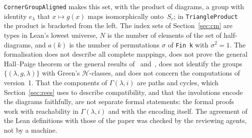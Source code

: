 \documentclass[11pt]{article}
\theoremstyle{remark}
\begin{document}
\texttt{CornerGroupAligned} makes this set, with the product of diagrams, a
group with identity $e_\lambda$ that $x\mapsto g(x)$ maps isomorphically
onto~$S_r$; in
\texttt{TriangleProduct} the product is bracketed from the left. The index sets
of Section~\ref{sec:cm} are types in Lean's lowest universe, $N$ is the number
of elements of the set of half-diagrams, and $a(k)$ is the number of
permutations $\sigma$ of \texttt{Fin~k} with $\sigma^2=1$. The formalisation
does not describe all complete mappings, does not prove the general Hall--Paige
theorem or the general results of~\cite{abchk} and~\cite{emrt}, does not
identify the groups $\{(\lambda,g,\lambda)\}$ with Green's $\mathcal
H$-classes, and does not concern the computations of version~1. That the
components of $\Gamma(\lambda,i)$ are paths and cycles, which
Section~\ref{sec:rees} uses to describe compatibility, and that the
involutions encode the diagrams faithfully, are not separate formal
statements: the formal proofs work with reachability in $\Gamma(\lambda,i)$
and with the encoding itself. The agreement of the Lean definitions with those
of the paper was checked by the reviewing agents, not by a machine.
\end{document}
